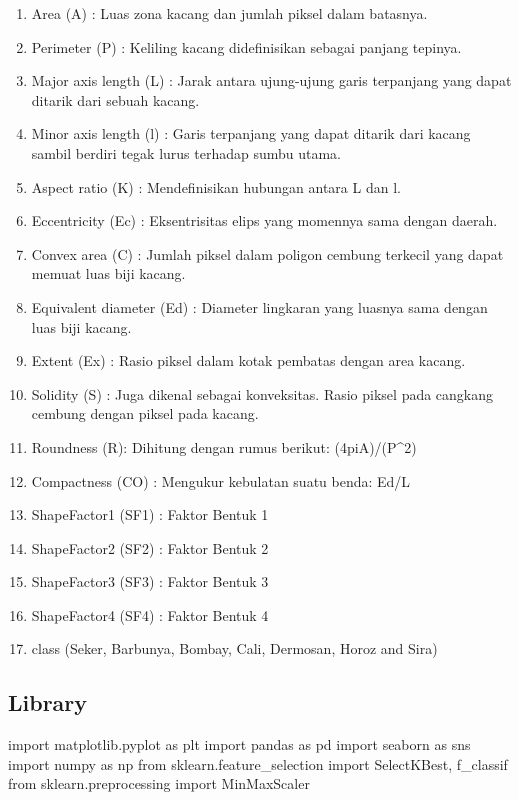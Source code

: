 \documentclass[
  letterpaper,
]{krantz}
\makeatletter
\newenvironment{Shaded}{\begin{snugshade}}{\end{snugshade}}
\newcommand{\ImportTok}[1]{\textcolor[rgb]{0.00,0.46,0.62}{#1}}
\newcommand{\NormalTok}[1]{\textcolor[rgb]{0.00,0.23,0.31}{#1}}
\providecommand{\tightlist}{%
  \setlength{\itemsep}{0pt}\setlength{\parskip}{0pt}}\usepackage{longtable,booktabs,array}
\newenvironment{kframe}{%
\medskip{}
\setlength{\fboxsep}{.8em}
 \def\at@end@of@kframe{}%
 \ifinner\ifhmode%
  \def\at@end@of@kframe{\end{minipage}}%
  \begin{minipage}{\columnwidth}%
 \fi\fi%
 \def\FrameCommand##1{\hskip\@totalleftmargin \hskip-\fboxsep
 \colorbox{shadecolor}{##1}\hskip-\fboxsep
     \hskip-\linewidth \hskip-\@totalleftmargin \hskip\columnwidth}%
 \MakeFramed {\advance\hsize-\width
   \@totalleftmargin\z@ \linewidth\hsize
   \@setminipage}}%
 {\par\unskip\endMakeFramed%
 \at@end@of@kframe}
\renewenvironment{Shaded}{\begin{kframe}}{\end{kframe}}
\makeatother
\begin{document}
\begin{enumerate}
\def\labelenumi{\arabic{enumi}.}
\tightlist
\item
  Area (A) : Luas zona kacang dan jumlah piksel dalam batasnya.
\item
  Perimeter (P) : Keliling kacang didefinisikan sebagai panjang tepinya.
\item
  Major axis length (L) : Jarak antara ujung-ujung garis terpanjang yang
  dapat ditarik dari sebuah kacang.
\item
  Minor axis length (l) : Garis terpanjang yang dapat ditarik dari
  kacang sambil berdiri tegak lurus terhadap sumbu utama.
\item
  Aspect ratio (K) : Mendefinisikan hubungan antara L dan l.
\item
  Eccentricity (Ec) : Eksentrisitas elips yang momennya sama dengan
  daerah.
\item
  Convex area (C) : Jumlah piksel dalam poligon cembung terkecil yang
  dapat memuat luas biji kacang.
\item
  Equivalent diameter (Ed) : Diameter lingkaran yang luasnya sama dengan
  luas biji kacang.
\item
  Extent (Ex) : Rasio piksel dalam kotak pembatas dengan area kacang.
\item
  Solidity (S) : Juga dikenal sebagai konveksitas. Rasio piksel pada
  cangkang cembung dengan piksel pada kacang.
\item
  Roundness (R): Dihitung dengan rumus berikut: (4piA)/(P\^{}2)
\item
  Compactness (CO) : Mengukur kebulatan suatu benda: Ed/L
\item
  ShapeFactor1 (SF1) : Faktor Bentuk 1
\item
  ShapeFactor2 (SF2) : Faktor Bentuk 2
\item
  ShapeFactor3 (SF3) : Faktor Bentuk 3
\item
  ShapeFactor4 (SF4) : Faktor Bentuk 4
\item
  class (Seker, Barbunya, Bombay, Cali, Dermosan, Horoz and Sira)
\end{enumerate}

\hypertarget{library}{%
\subsection{Library}\label{library}}

\begin{Shaded}
\begin{Highlighting}[]
\ImportTok{import}\NormalTok{ matplotlib.pyplot }\ImportTok{as}\NormalTok{ plt}
\ImportTok{import}\NormalTok{ pandas }\ImportTok{as}\NormalTok{ pd}
\ImportTok{import}\NormalTok{ seaborn }\ImportTok{as}\NormalTok{ sns}
\ImportTok{import}\NormalTok{ numpy }\ImportTok{as}\NormalTok{ np}
\ImportTok{from}\NormalTok{ sklearn.feature\_selection }\ImportTok{import}\NormalTok{ SelectKBest, f\_classif}
\ImportTok{from}\NormalTok{ sklearn.preprocessing }\ImportTok{import}\NormalTok{ MinMaxScaler}

\end{Highlighting}
\end{Shaded}
\end{document}
